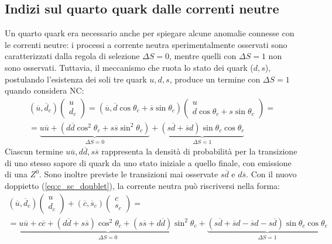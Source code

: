 \documentclass{subnucbo}
\begin{document}
\subsection{Indizi sul quarto quark dalle correnti neutre}
Un quarto quark era necessario anche per spiegare alcune anomalie connesse con le correnti neutre: i processi a corrente neutra sperimentalmente osservati sono caratterizzati dalla regola di selezione $\Delta S = 0$, mentre quelli con $\Delta S = 1$ non sono osservati. Tuttavia, il meccanismo che ruota lo stato dei quark ($d, s$), postulando l'esistenza dei soli tre quark $u, d, s$, produce un termine con $\Delta S = 1$ quando considera NC:
\begin{equation}
        \begin{array} { c } { \left( \overline { u } , \overline { d } _ { c } \right) \left( \begin{array} { c } { u } \\ { d _ { c } } \end{array} \right) = \left( \overline { u } , \overline { d } \cos \theta _ { c } + \overline { s } \sin \theta _ { c } \right) \left( \begin{array} { c } { u } \\ { d \cos \theta _ { c } + s \sin \theta _ { c } } \end{array} \right) = } \\ { = \underbrace { u \overline { u } + \left( d \overline { d } \cos ^ { 2 } \theta _ { c } + s \overline { s } \sin ^ { 2 } \theta _ { c } \right) } _ { \Delta S = 0 } + \underbrace { ( s \overline { d } + \overline { s } d ) \sin \theta _ { c } \cos \theta _ { c } } _ { \Delta S = 1 } } \end{array}
\end{equation}
Ciascun termine $u \overline { u } , d \overline { d } , s \overline { s }$ rappresenta la densità di probabilità per la transizione di uno stesso sapore di quark da uno stato iniziale a quello finale, con emissione di una $Z^{0}$. Sono inoltre previste le transizioni mai osservate $s\overline{d}$ e $d\overline{s}$. Con il nuovo doppietto (\ref{eq:c_sc_doublet}), la corrente neutra può riscriversi nella forma:
\begin{equation}
        \begin{array} { l } { \left( \overline { u } , \overline { d } _ { c } \right) \left( \begin{array} { c } { u } \\ { d _ { c } } \end{array} \right) + \left( \overline { c } , \overline { s } _ { c } \right) \left( \begin{array} { c } { c } \\ { s _ { c } } \end{array} \right) = } \\ { = \underbrace { u \overline { u } + c \overline { c } + ( d \overline { d } + s \overline { s } ) \cos ^ { 2 } \theta _ { c } + ( s \overline { s } + d \overline { d } ) \sin ^ { 2 } \theta _ { c } } _ { \Delta S = 0 } + \underbrace { ( s \overline { d } + \overline { s } d - \overline { s } d - s \overline { d } ) \sin \theta _ { c } \cos \theta _ { c } } _ { \Delta S = 1 } } \end{array}
\end{equation}
\end{document}
